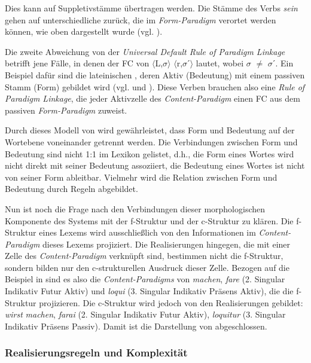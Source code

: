 Dies kann auf Suppletivstämme übertragen werden. Die Stämme des Verbs \textit{sein} gehen auf unterschiedliche  zurück, die im \textit{Form-Paradigm} verortet werden können, wie oben dargestellt wurde (vgl. ).

Die zweite Abweichung von der \textit{Universal Default Rule of Paradigm Linkage} betrifft jene Fälle, in denen der FC von $\langle$L,$\sigma$$\rangle$ $\langle$r,$\sigma$ˊ$\rangle$ lautet, wobei $\sigma$ $\neq$ $\sigma$ˊ. Ein Beispiel dafür sind die lateinischen , deren Aktiv (Bedeutung) mit einem passiven Stamm (Form) gebildet wird (vgl.  und ). Diese Verben brauchen also eine \textit{Rule of Paradigm Linkage}, die jeder Aktivzelle des \textit{Content-Paradigm} einen FC aus dem passiven \textit{Form-Paradigm} zuweist.

Durch dieses Modell von \citet{AckermanStump2004} wird gewährleistet, dass Form und Bedeutung auf der Wortebene voneinander getrennt werden. Die Verbindungen zwischen Form und Bedeutung sind nicht 1:1 im Lexikon gelistet, d.h., die Form eines Wortes wird nicht direkt mit seiner Bedeutung assoziiert, die Bedeutung eines Wortes ist nicht von seiner Form ableitbar. Vielmehr wird die Relation zwischen Form und Bedeutung durch Regeln abgebildet.

Nun ist noch die Frage nach den Verbindungen dieser morphologischen Komponente des Systems mit der f-Struk\-tur und der c-Struk\-tur zu klären. Die f-Struk\-tur eines Lexems wird ausschließlich von den Informationen im \textit{Content-Pa\-ra\-digm} dieses Lexems projiziert. Die Realisierungen hingegen, die mit einer Zelle des \textit{Content-Paradigm} verknüpft sind, bestimmen nicht die f-Struk\-tur, sondern bilden nur den c-struk\-tu\-rel\-len Ausdruck dieser Zelle. Bezogen auf die Beispiel in  sind es also die \textit{Content-Paradigms} von \textit{machen}, \textit{fare} (2. Singular Indikativ Futur Aktiv) und \textit{loqui} (3. Singular Indikativ Präsens Aktiv), die die f-Struk\-tur projizieren. Die c-Struk\-tur wird jedoch von den Realisierungen gebildet: \textit{wirst} \textit{machen}, \textit{farai} (2. Singular Indikativ Futur Aktiv), \textit{loquitur} (3. Singular Indikativ Präsens Passiv). Damit ist die Darstellung von \citet[117–124]{AckermanStump2004} abgeschlossen.

\subsubsection{Realisierungsregeln und Komplexität}\label{4.1.3.2}

